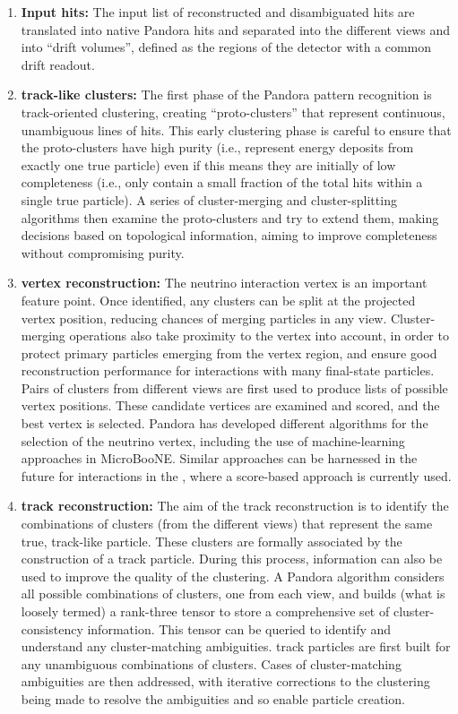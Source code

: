 \begin{enumerate}
\item{\bf Input hits:} The input list of reconstructed and disambiguated \twod hits are translated into native Pandora \twod hits and separated into the different views and into ``drift volumes'', defined as the regions of the detector with a common drift readout.
\item{\bf \twod track-like clusters:}  The first phase of the Pandora pattern recognition is track-oriented \twod clustering, creating ``proto-clusters'' that represent continuous, unambiguous lines of \twod hits. This early clustering phase is careful to ensure that the proto-clusters have high purity (i.e., represent energy deposits from exactly one true particle) even if this means they are initially of low completeness (i.e., only contain a small fraction of the total hits within a single true particle). A series of cluster-merging and cluster-splitting algorithms then examine the \twod proto-clusters and try to extend them, making decisions based on topological information, aiming to improve completeness without compromising purity.
\item{\bf \threed vertex reconstruction:} The neutrino interaction vertex is an important feature point. Once identified, any \twod clusters can be split at the projected vertex position, reducing chances of merging particles in any view. Cluster-merging operations also take proximity to the vertex into account, in order to protect primary particles emerging from the vertex region, and ensure good reconstruction performance for interactions with many final-state particles. Pairs of \twod clusters from different views are first used to produce lists of possible \threed vertex positions. These candidate vertices are examined and scored, and the best vertex is selected. Pandora has developed different algorithms for the selection of the neutrino vertex, including the use of machine-learning approaches in MicroBooNE. Similar approaches can be harnessed in the future for interactions in %
the , where a score-based approach is currently used.
\item{\bf \threed track reconstruction:} The aim of the \threed track reconstruction is to identify the combinations of \twod clusters (from the different views) that represent the same true, track-like particle. These \twod clusters are formally associated by the construction of a \threed track particle. During this process, \threed information can also be used to improve the quality of the \twod clustering. A Pandora algorithm considers all possible combinations of \twod clusters, one from each view, and builds (what is loosely termed) a rank-three tensor to store a comprehensive set of cluster-consistency information. This tensor can be queried to identify and understand any cluster-matching ambiguities. \threed track particles are first built for any unambiguous combinations of \twod clusters. Cases of cluster-matching ambiguities are then addressed, with iterative corrections to the \twod clustering being made to resolve the ambiguities and so enable \threed particle creation.

\end{enumerate}
